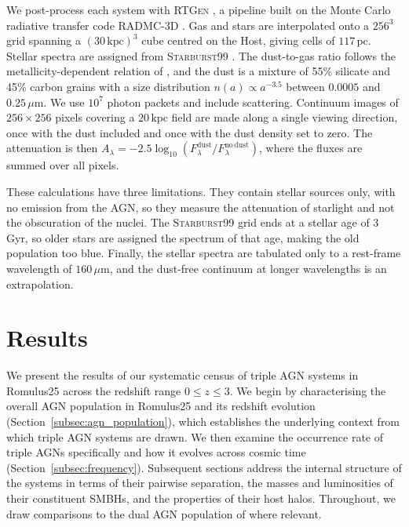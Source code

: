 \documentclass[twocolumn, 10pt]{article}
\begin{document}
We post-process each system with \textsc{RTGen} \citep{Sinigaglia2025}, a pipeline built on the Monte Carlo radiative transfer code \textsc{RADMC-3D} \citep{Dullemond2012}. Gas and stars are interpolated onto a $256^3$ grid spanning a $(30\,\mathrm{kpc})^3$ cube centred on the Host, giving cells of $117\,\mathrm{pc}$. Stellar spectra are assigned from \textsc{Starburst99} \citep{Leitherer1999}. The dust-to-gas ratio follows the metallicity-dependent relation of \citet{Li2019}, and the dust is a mixture of 55\% silicate and 45\% carbon grains with a size distribution $n(a) \propto a^{-3.5}$ between $0.0005$ and $0.25\,\mu\mathrm{m}$. We use $10^7$ photon packets and include scattering. Continuum images of $256 \times 256$ pixels covering a $20\,\mathrm{kpc}$ field are made along a single viewing direction, once with the dust included and once with the dust density set to zero. The attenuation is then $A_\lambda = -2.5 \log_{10}(F_\lambda^\mathrm{dust}/F_\lambda^\mathrm{no\,dust})$, where the fluxes are summed over all pixels.

These calculations have three limitations. They contain stellar sources only, with no emission from the AGN, so they measure the attenuation of starlight and not the obscuration of the nuclei. The \textsc{Starburst99} grid ends at a stellar age of 3\,Gyr, so older stars are assigned the spectrum of that age, making the old population too blue. Finally, the stellar spectra are tabulated only to a rest-frame wavelength of $160\,\mu\mathrm{m}$, and the dust-free continuum at longer wavelengths is an extrapolation.






\newpage
\section{Results}
\label{sec:results}
 
We present the results of our systematic census of triple AGN systems in Romulus25 across the redshift range $0 \leq z \leq 3$. We begin by characterising the overall AGN population in Romulus25 and its redshift evolution (Section~\ref{subsec:agn_population}), which establishes the underlying context from which triple AGN systems are drawn. We then examine the occurrence rate of triple AGNs specifically and how it evolves across cosmic time (Section~\ref{subsec:frequency}). Subsequent sections address the internal structure of the systems in terms of their pairwise separation, the masses and luminosities of their constituent SMBHs, and the properties of their host halos. Throughout, we draw comparisons to the dual AGN population of \citet{Saeedzadeh2024} where relevant.
 
\end{document}
